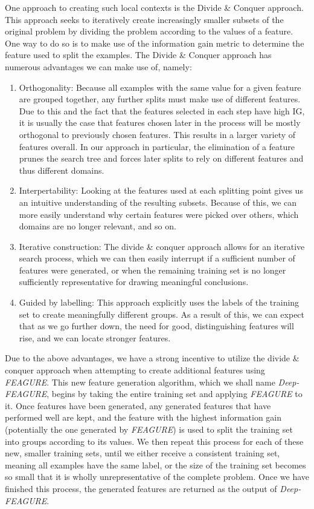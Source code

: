\documentclass[twoside,11pt]{article}
\theoremstyle{definition}
\begin{document}
One approach to creating such local contexts is the Divide \& Conquer approach. This approach seeks to iteratively create increasingly smaller subsets of the original problem by dividing the problem according to the values of a feature. One way to do so is to make use of the information gain \cite{quinlan1986} metric to determine the feature used to split the examples. The Divide \& Conquer approach has numerous advantages we can make use of, namely:
\begin{enumerate}
	\item Orthogonality: Because all examples with the same value for a given feature are grouped together, any further splits must make use of different features. Due to this and the fact that the features selected in each step have high IG, it is usually the case that features chosen later in the process will be mostly orthogonal to previously chosen features. This results in a larger variety of features overall. In our approach in particular, the elimination of a feature prunes the search tree and forces later splits to rely on different features and thus different domains.
	\item Interpertability: Looking at the features used at each splitting point gives us an intuitive understanding of the resulting subsets. Because of this, we can more easily understand why certain features were picked over others, which domains are no longer relevant, and so on.
	\item Iterative construction: The divide \& conquer approach allows for an iterative search process, which we can then easily interrupt if a sufficient number of features were generated, or when the remaining training set is no longer sufficiently representative for drawing meaningful conclusions.
	\item Guided by labelling: This approach explicitly uses the labels of the training set to create meaningfully different groups. As a result of this, we can expect that as we go further down, the need for good, distinguishing features will rise, and we can locate stronger features.
\end{enumerate}

Due to the above advantages, we have a strong incentive to utilize the divide \& conquer approach when attempting to create additional features using \emph{FEAGURE}. This new feature generation algorithm, which we shall name \emph{Deep-FEAGURE}, begins by taking the entire training set and applying \emph{FEAGURE} to it. Once features have been generated, any generated features that have performed well are kept, and the feature with the highest information gain (potentially the one generated by \emph{FEAGURE}) is used to split the training set into groups according to its values.
We then repeat this process for each of these new, smaller training sets, until we either receive a consistent training set, meaning all examples have the same label, or the size of the training set becomes so small that it is wholly unrepresentative of the complete problem.
Once we have finished this process, the generated features are returned as the output of \emph{Deep-FEAGURE}.
\end{document}
